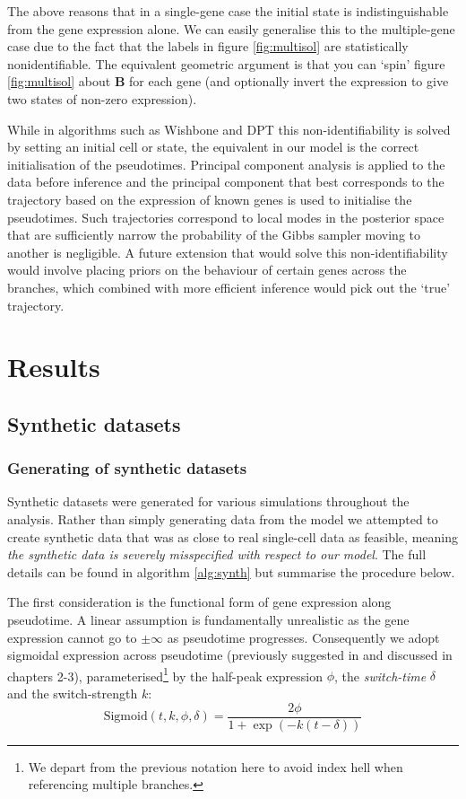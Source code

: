 The above reasons that in a single-gene case the initial state is indistinguishable from the gene expression alone. We can easily generalise this to the multiple-gene case due to the fact that the labels in figure \ref{fig:multisol} are statistically nonidentifiable. The equivalent geometric argument is that you can `spin' figure \ref{fig:multisol} about \textbf{B} for each gene (and optionally invert the expression to give two states of non-zero expression).

While in algorithms such as Wishbone and DPT this non-identifiability is solved by setting an initial cell or state, the equivalent in our model is the correct initialisation of the pseudotimes. Principal component analysis is applied to the data before inference and the principal component that best corresponds to the trajectory based on the expression of known genes is used to initialise the pseudotimes. Such trajectories correspond to local modes in the posterior space that are sufficiently narrow the probability of the Gibbs sampler moving to another is negligible. A future extension that would solve this non-identifiability would involve placing priors on the behaviour of certain genes across the branches, which combined with more efficient inference would pick out the `true' trajectory.


\section{Results}


\subsection{Synthetic datasets}

\subsubsection{Generating of synthetic datasets}

Synthetic datasets were generated for various simulations throughout the analysis. Rather than simply generating data from the model we attempted to create synthetic data that was as close to real single-cell data as feasible, meaning \emph{the synthetic data is severely misspecified with respect to our model}. The full details can be found in algorithm \ref{alg:synth} but summarise the procedure below.

The first consideration is the functional form of gene expression along pseudotime. A linear assumption is fundamentally unrealistic as the gene expression cannot go to $\pm \infty$ as pseudotime progresses. Consequently we adopt sigmoidal expression across pseudotime (previously suggested in \cite{campbell2016order,campbell2016switchde} and discussed in chapters 2-3), parameterised\footnote{We depart from the previous notation here to avoid index hell when referencing multiple branches.} by the half-peak expression $\phi$, the \emph{switch-time} $\delta$ and the switch-strength $k$:
\begin{equation}\label{eq:sigmoid}
      \text{Sigmoid}(t, k, \phi, \delta)  = \frac{2 \phi}{1 + \exp(-k(t - \delta))}
\end{equation}


